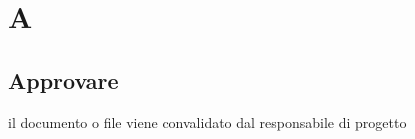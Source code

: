 \section{A}
\subsection{Approvare}
il documento o file viene convalidato dal responsabile di progetto
\clearpage 
